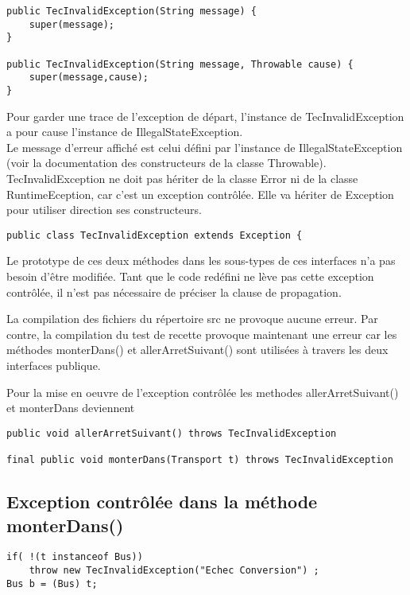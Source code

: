 \documentclass[12pt,a4paper]{article}
\begin{document}
\begin{verbatim}
public TecInvalidException(String message) {
	super(message);
}

public TecInvalidException(String message, Throwable cause) {
	super(message,cause);
}
\end{verbatim}

Pour garder une trace de l’exception de départ, l’instance de TecInvalidException a pour cause l’instance de IllegalStateException. \\
Le message d’erreur affiché est celui défini par l’instance de IllegalStateException (voir la documentation des constructeurs de la classe Throwable). \\

TecInvalidException ne doit pas hériter de la classe Error ni de la classe RuntimeEception, car c'est un exception contrôlée. Elle va hériter de Exception pour utiliser direction ses constructeurs.\\ 

\begin{verbatim}
public class TecInvalidException extends Exception {
\end{verbatim}

Le prototype de ces deux méthodes dans les sous-types de ces interfaces n’a pas besoin d’être modifiée. Tant que le code redéfini ne lève pas cette exception contrôlée, il n’est pas nécessaire de préciser la clause de propagation.

La compilation des fichiers du répertoire src ne provoque aucune erreur. Par contre, la compilation du test de recette provoque maintenant une erreur car les méthodes monterDans() et allerArretSuivant() sont utilisées à travers les deux interfaces publique.

Pour la mise en oeuvre de l'exception contrôlée les methodes allerArretSuivant() et monterDans deviennent 
\begin{verbatim}
public void allerArretSuivant() throws TecInvalidException 

final public void monterDans(Transport t) throws TecInvalidException 
\end{verbatim}


\subsection{Exception contrôlée dans la méthode monterDans()}

\begin{verbatim}
if( !(t instanceof Bus))
	throw new TecInvalidException("Echec Conversion") ;
Bus b = (Bus) t;
\end{verbatim}
\end{document}
